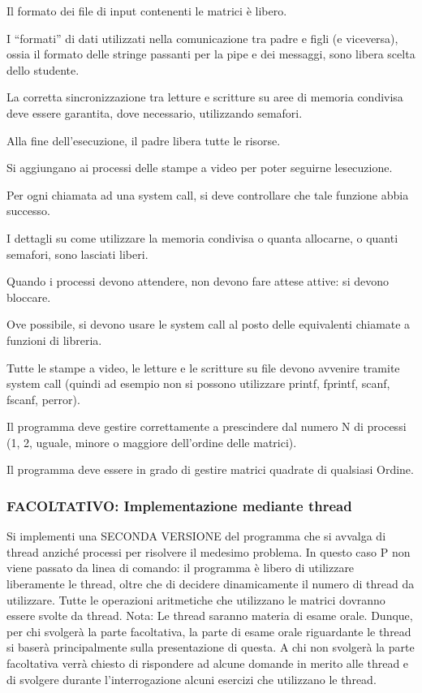 \begin{DoxyItemize}
\item Il formato dei file di input contenenti le matrici è libero.
\item I “formati” di dati utilizzati nella comunicazione tra padre e figli (e viceversa), ossia il formato delle stringe passanti per la pipe e dei messaggi, sono libera scelta dello studente.
\item La corretta sincronizzazione tra letture e scritture su aree di memoria condivisa deve essere garantita, dove necessario, utilizzando semafori.
\item Alla fine dell’esecuzione, il padre libera tutte le risorse.
\item Si aggiungano ai processi delle stampe a video per poter seguirne l\textquotesingle{}esecuzione.
\item Per ogni chiamata ad una system call, si deve controllare che tale funzione abbia successo.
\item I dettagli su come utilizzare la memoria condivisa o quanta allocarne, o quanti semafori, sono lasciati liberi.
\item Quando i processi devono attendere, non devono fare attese attive\+: si devono bloccare.
\item Ove possibile, si devono usare le system call al posto delle equivalenti chiamate a funzioni di libreria.
\item Tutte le stampe a video, le letture e le scritture su file devono avvenire tramite system call (quindi ad esempio non si possono utilizzare printf, fprintf, scanf, fscanf, perror).
\item Il programma deve gestire correttamente a prescindere dal numero N di processi (1, 2, uguale, minore o maggiore dell’ordine delle matrici).
\item Il programma deve essere in grado di gestire matrici quadrate di qualsiasi Ordine.
\end{DoxyItemize}

\subsubsection*{F\+A\+C\+O\+L\+T\+A\+T\+I\+VO\+: Implementazione mediante thread}

Si implementi una S\+E\+C\+O\+N\+DA V\+E\+R\+S\+I\+O\+NE del programma che si avvalga di thread anziché processi per risolvere il medesimo problema. In questo caso P non viene passato da linea di comando\+: il programma è libero di utilizzare liberamente le thread, oltre che di decidere dinamicamente il numero di thread da utilizzare. Tutte le operazioni aritmetiche che utilizzano le matrici dovranno essere svolte da thread. Nota\+: Le thread saranno materia di esame orale. Dunque, per chi svolgerà la parte facoltativa, la parte di esame orale riguardante le thread si baserà principalmente sulla presentazione di questa. A chi non svolgerà la parte facoltativa verrà chiesto di rispondere ad alcune domande in merito alle thread e di svolgere durante l’interrogazione alcuni esercizi che utilizzano le thread.

